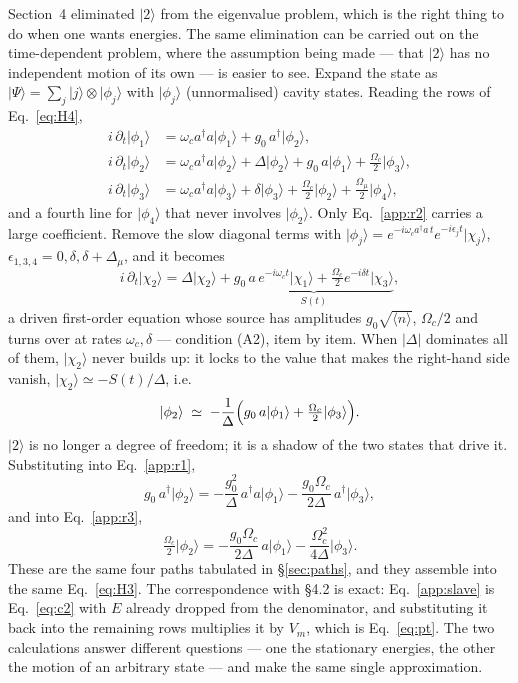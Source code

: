 \documentclass[11pt,a4paper]{article}
\newcommand{\ket}[1]{\lvert #1 \rangle}
\newcommand{\dg}{^{\dagger}}
\newcommand{\Om}{\Omega}
\newcommand{\Omu}{\Omega_{\mu}}
\newcommand{\Dmu}{\Delta_{\mu}}
\begin{document}
Section~4 eliminated $\ket{2}$ from the eigenvalue problem, which is the right thing to do when
one wants energies. The same elimination can be carried out on the time-dependent problem, where
the assumption being made --- that $\ket{2}$ has no independent motion of its own --- is easier
to see. Expand the state as $\ket{\Psi}=\sum_j\ket{j}\otimes\ket{\phi_j}$ with $\ket{\phi_j}$ (unnormalised) cavity
states. Reading the rows of Eq.~\eqref{eq:H4},
\begin{align}
  i\,\partial_t\ket{\phi_1} &= \omega_c a\dg a\ket{\phi_1} + g_0\,a\dg\ket{\phi_2},
    \label{app:r1}\\
  i\,\partial_t\ket{\phi_2} &= \omega_c a\dg a\ket{\phi_2} + \Delta\ket{\phi_2}
     + g_0\,a\ket{\phi_1} + \tfrac{\Om_c}{2}\ket{\phi_3},
    \label{app:r2}\\
  i\,\partial_t\ket{\phi_3} &= \omega_c a\dg a\ket{\phi_3} + \delta\ket{\phi_3}
     + \tfrac{\Om_c}{2}\ket{\phi_2} + \tfrac{\Omu}{2}\ket{\phi_4},
    \label{app:r3}
\end{align}
and a fourth line for $\ket{\phi_4}$ that never involves $\ket{\phi_2}$. Only
Eq.~\eqref{app:r2} carries a large coefficient. Remove the slow diagonal terms with
$\ket{\phi_j}=e^{-i\omega_c a\dg a\,t}e^{-i\epsilon_j t}\ket{\chi_j}$,
$\epsilon_{1,3,4}=0,\delta,\delta+\Dmu$, and it becomes
\begin{equation}
  i\,\partial_t\ket{\chi_2} = \Delta\ket{\chi_2}
   + \underbrace{g_0\,a\,e^{-i\omega_c t}\ket{\chi_1}
     + \tfrac{\Om_c}{2}e^{-i\delta t}\ket{\chi_3}}_{\textstyle S(t)} ,
\end{equation}
a driven first-order equation whose source has amplitudes $g_0\sqrt{\langle n\rangle}$,
$\Om_c/2$ and turns over at rates $\omega_c,\delta$ --- condition (A2), item by item. When
$|\Delta|$ dominates all of them, $\ket{\chi_2}$ never builds up: it locks to the value that
makes the right-hand side vanish, $\ket{\chi_2}\simeq-S(t)/\Delta$, i.e.
\begin{equation}
  \ket{\phi_2} \;\simeq\; -\frac{1}{\Delta}
    \Bigl(g_0\,a\ket{\phi_1} + \tfrac{\Om_c}{2}\ket{\phi_3}\Bigr).
  \label{app:slave}
\end{equation}
$\ket{2}$ is no longer a degree of freedom; it is a shadow of the two states that drive it.
Substituting into Eq.~\eqref{app:r1},
\begin{equation}
  g_0\,a\dg\ket{\phi_2} = -\frac{g_0^2}{\Delta}\,a\dg a\ket{\phi_1}
      - \frac{g_0\Om_c}{2\Delta}\,a\dg\ket{\phi_3},
\end{equation}
and into Eq.~\eqref{app:r3},
\begin{equation}
  \tfrac{\Om_c}{2}\ket{\phi_2} = -\frac{g_0\Om_c}{2\Delta}\,a\ket{\phi_1}
      - \frac{\Om_c^{2}}{4\Delta}\ket{\phi_3}.
\end{equation}
These are the same four paths tabulated in \S\ref{sec:paths}, and they assemble into the same
Eq.~\eqref{eq:H3}. The correspondence with \S4.2 is exact: Eq.~\eqref{app:slave} is
Eq.~\eqref{eq:c2} with $E$ already dropped from the denominator, and substituting it back into
the remaining rows multiplies it by $V_m$, which is Eq.~\eqref{eq:pt}. The two calculations
answer different questions --- one the stationary energies, the other the motion of an arbitrary
state --- and make the same single approximation.
\end{document}
